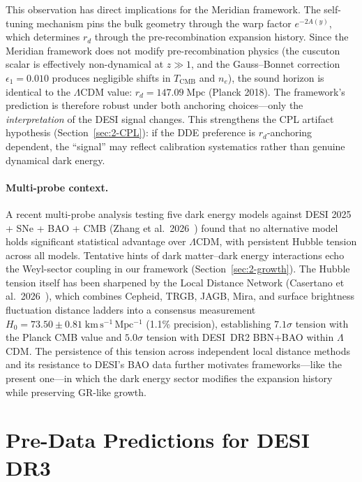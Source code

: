 This observation has direct implications for the Meridian framework. The self-tuning mechanism pins the bulk geometry through the warp factor $e^{-2A(y)}$, which determines $r_d$ through the pre-recombination expansion history. Since the Meridian framework does not modify pre-recombination physics (the cuscuton scalar is effectively non-dynamical at $z \gg 1$, and the Gauss--Bonnet correction $\epsilon_1 = 0.010$ produces negligible shifts in $T_\mathrm{CMB}$ and $n_e$), the sound horizon is identical to the $\Lambda$CDM value: $r_d = 147.09\;\mathrm{Mpc}$ (Planck 2018). The framework's prediction is therefore robust under both anchoring choices---only the \emph{interpretation} of the DESI signal changes. This strengthens the CPL artifact hypothesis (Section~\ref{sec:2-CPL}): if the DDE preference is $r_d$-anchoring dependent, the ``signal'' may reflect calibration systematics rather than genuine dynamical dark energy.

\paragraph{Multi-probe context.}
A recent multi-probe analysis testing five dark energy models against DESI 2025 + SNe + BAO + CMB (Zhang et al.\ 2026~\cite{ch2:Zhang2026}) found that no alternative model holds significant statistical advantage over $\Lambda$CDM, with persistent Hubble tension across all models. Tentative hints of dark matter--dark energy interactions echo the Weyl-sector coupling in our framework (Section~\ref{sec:2-growth}). The Hubble tension itself has been sharpened by the Local Distance Network (Casertano et al.\ 2026~\cite{ch2:H0DN2026}), which combines Cepheid, TRGB, JAGB, Mira, and surface brightness fluctuation distance ladders into a consensus measurement $H_0 = 73.50 \pm 0.81\;\mathrm{km\,s^{-1}\,Mpc^{-1}}$ (1.1\% precision), establishing $7.1\sigma$ tension with the Planck CMB value and $5.0\sigma$ tension with DESI~DR2 BBN+BAO within $\Lambda$CDM. The persistence of this tension across independent local distance methods and its resistance to DESI's BAO data further motivates frameworks---like the present one---in which the dark energy sector modifies the expansion history while preserving GR-like growth.

\section{Pre-Data Predictions for DESI DR3}
\label{sec:2-DR3}

